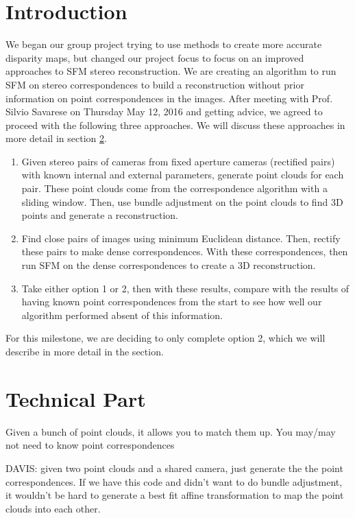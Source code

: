 \documentclass[journal]{IEEEtran}
\begin{document}
\section{Introduction} \label{introduction}
We began our group project trying to use methods to create more accurate disparity maps, but changed our project focus to focus on an improved approaches to SFM stereo reconstruction. We are creating an algorithm to run SFM on stereo correspondences to build a reconstruction without prior information on point correspondences in the images. After meeting with Prof. Silvio Savarese on Thursday May 12, 2016 and getting advice, we agreed to proceed with the following three approaches. We will discuss these approaches in more detail in section \ref{technicalpart}.
\begin{enumerate}
  \item Given stereo pairs of cameras from fixed aperture cameras (rectified pairs) with known internal and external parameters, generate point clouds for each pair. These point clouds come from the correspondence algorithm with a sliding window. Then, use bundle adjustment on the point clouds to find 3D points and generate a reconstruction.
  \item Find close pairs of images using minimum Euclidean distance. Then, rectify these pairs to make dense correspondences. With these correspondences, then run SFM on the dense correspondences to create a 3D reconstruction.
  \item Take either option 1 or 2, then with these results, compare with the results of having known point correspondences from the start to see how well our algorithm performed absent of this information.
\end{enumerate}
For this milestone, we are deciding to only complete option 2, which we will describe in more detail in the section.

\section{Technical Part} \label{technicalpart}

Given a bunch of point clouds, it allows you to match them up. You may/may not need to know point correspondences 

DAVIS: given two point clouds and a shared camera, just generate the the point correspondences. If we have this code and didn't want to do bundle adjustment, it wouldn't be hard to generate a best fit affine transformation to map the point clouds into each other.
\end{document}
